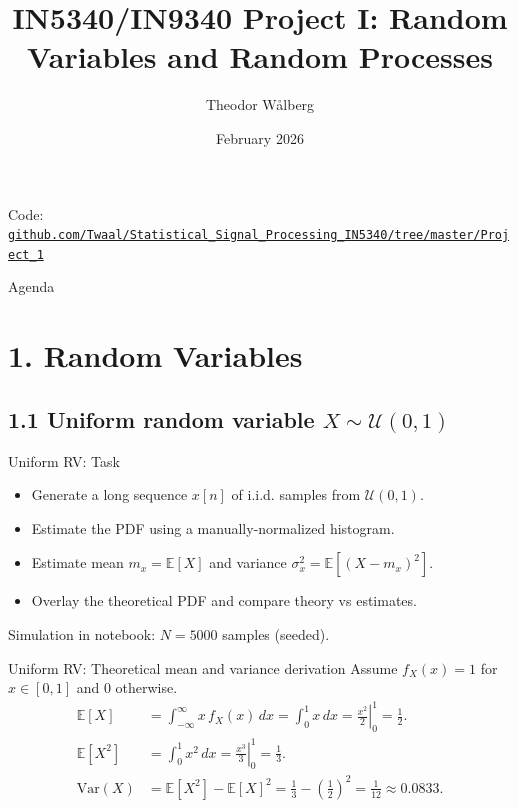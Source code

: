 \documentclass[aspectratio=169,10pt]{beamer}
\title[IN5340 Project I]{IN5340/IN9340 Project I: Random Variables and Random Processes}
\author{Theodor W\aa lberg}
\institute{University of Oslo}
\date{February 2026}
\begin{document}
\begin{frame}
	\titlepage
	\vspace{-1.0em}
	\centering
	\footnotesize
	Code: \href{https://github.com/Twaal/Statistical_Signal_Processing_IN5340/tree/master/Project_1}{\nolinkurl{github.com/Twaal/Statistical_Signal_Processing_IN5340/tree/master/Project_1}}
\end{frame}

\begin{frame}{Agenda}
	\tableofcontents
\end{frame}

\section{1. Random Variables}

\subsection{1.1 Uniform random variable \texorpdfstring{$X \sim \mathcal{U}(0,1)$}{X ~ U(0,1)}}

\begin{frame}{Uniform RV: Task}
\begin{itemize}
	\item Generate a long sequence $x[n]$ of i.i.d. samples from $\mathcal{U}(0,1)$.
	\item Estimate the PDF using a manually-normalized histogram.
	\item Estimate mean $m_x = \mathbb{E}[X]$ and variance $\sigma_x^2 = \mathbb{E}[(X-m_x)^2]$.
	\item Overlay the theoretical PDF and compare theory vs estimates.
\end{itemize}
\vspace{0.5em}
\small
Simulation in notebook: $N=5000$ samples (seeded).
\end{frame}

\begin{frame}{Uniform RV: Theoretical mean and variance derivation}
Assume $f_X(x)=1$ for $x\in[0,1]$ and $0$ otherwise.
\vspace{0.5em}
\begin{align*}
\mathbb{E}[X]
&= \int_{-\infty}^{\infty} x\, f_X(x)\,dx
= \int_{0}^{1} x\,dx
= \left.\frac{x^2}{2}\right|_{0}^{1}
= \frac{1}{2}.\\
\mathbb{E}[X^2]
&= \int_{0}^{1} x^2\,dx
= \left.\frac{x^3}{3}\right|_{0}^{1}
= \frac{1}{3}.\\
\mathrm{Var}(X)
&= \mathbb{E}[X^2]-\mathbb{E}[X]^2
= \frac{1}{3}-\left(\frac{1}{2}\right)^2
= \frac{1}{12}\approx 0.0833.
\end{align*}
\end{frame}
\end{document}
